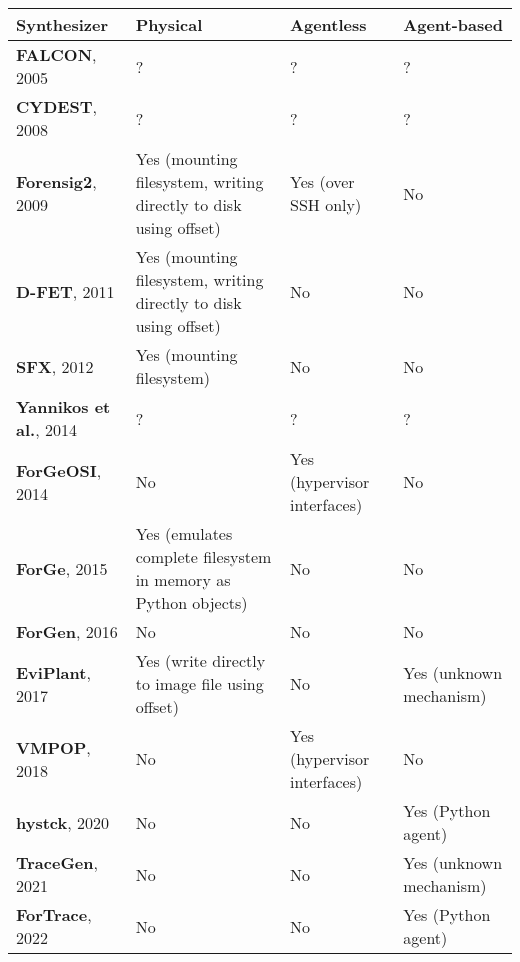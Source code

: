 \begin{longtable}[]{@{}
  >{\raggedright\arraybackslash}p{}
  >{\raggedright\arraybackslash}p{}
  >{\raggedright\arraybackslash}p{}
  >{\raggedright\arraybackslash}p{}@{}}
\toprule\noalign{}
\begin{minipage}[b]{\linewidth}\raggedright
Synthesizer
\end{minipage} & \begin{minipage}[b]{\linewidth}\raggedright
Physical
\end{minipage} & \begin{minipage}[b]{\linewidth}\raggedright
Agentless
\end{minipage} & \begin{minipage}[b]{\linewidth}\raggedright
Agent-based
\end{minipage} \\
\midrule\noalign{}
\endhead
\bottomrule\noalign{}
\endlastfoot
\textbf{FALCON}, 2005 & ? & ? & ? \\
\textbf{CYDEST}, 2008 & ? & ? & ? \\
\textbf{Forensig2}, 2009 & Yes (mounting filesystem, writing directly to
disk using offset) & Yes (over SSH only) & No \\
\textbf{D-FET}, 2011 & Yes (mounting filesystem, writing directly to
disk using offset) & No & No \\
\textbf{SFX}, 2012 & Yes (mounting filesystem) & No & No \\
\textbf{Yannikos et al.}, 2014 & ? & ? & ? \\
\textbf{ForGeOSI}, 2014 & No & Yes (hypervisor interfaces) & No \\
\textbf{ForGe}, 2015 & Yes (emulates complete filesystem in memory as
Python objects) & No & No \\
\textbf{ForGen}, 2016 & No & No & No \\
\textbf{EviPlant}, 2017 & Yes (write directly to image file using
offset) & No & Yes (unknown mechanism) \\
\textbf{VMPOP}, 2018 & No & Yes (hypervisor interfaces) & No \\
\textbf{hystck}, 2020 & No & No & Yes (Python agent) \\
\textbf{TraceGen}, 2021 & No & No & Yes (unknown mechanism) \\
\textbf{ForTrace}, 2022 & No & No & Yes (Python agent) \\
\end{longtable}

